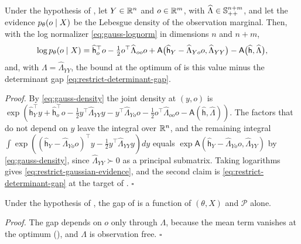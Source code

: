 Under the hypothesis of
, let
\(Y\in\mathbb R^n\) and \(o\in\mathbb R^m\), with \(\widehat\Lambda\in\mathbb S_{++}^{n+m}\), and let the
evidence \(p_\theta(o\mid X)\) be the Lebesgue density of the observation
marginal. Then, with the log normalizer \eqref{eq:gauss-lognorm} in dimensions
\(n\) and \(n+m\),
\begin{equation}
\log p_\theta(o\mid X)
=\widehat{\mathsf h}_o^\top o-\tfrac12o^\top\widehat\Lambda_{oo}o
+\mathsf A\bigl(\widehat{\mathsf h}_Y-\widehat\Lambda_{Yo}o,\widehat\Lambda_{YY}\bigr)
-\mathsf A\bigl(\widehat{\mathsf h},\widehat\Lambda\bigr),
\label{eq:restrict-gaussian-evidence}
\end{equation}
and, with \(\Lambda=\widehat\Lambda_{YY}\), the bound at the optimum of
 is this value minus the determinant gap
\eqref{eq:restrict-determinant-gap}. 

\noindent\emph{Proof.}
By \eqref{eq:gauss-density} the joint density at \((y,o)\) is
\(\exp(\widehat{\mathsf h}_Y^\top y+\widehat{\mathsf h}_o^\top o
-\tfrac12y^\top\widehat\Lambda_{YY}y-y^\top\widehat\Lambda_{Yo}o
-\tfrac12o^\top\widehat\Lambda_{oo}o-\mathsf A(\widehat{\mathsf h},\widehat\Lambda))\).
The factors that do not depend on \(y\) leave the integral over \(\mathbb R^n\), and the
remaining integral
\(\int\exp((\widehat{\mathsf h}_Y-\widehat\Lambda_{Yo}o)^\top y-\tfrac12y^\top\widehat\Lambda_{YY}y)dy\)
equals \(\exp\mathsf A(\widehat{\mathsf h}_Y-\widehat\Lambda_{Yo}o,\widehat\Lambda_{YY})\) by
\eqref{eq:gauss-density}, since \(\widehat\Lambda_{YY}\succ0\) as a principal submatrix.
Taking logarithms gives \eqref{eq:restrict-gaussian-evidence}, and the second claim
is \eqref{eq:restrict-determinant-gap} at the target of
. \(\square\)

Under the hypothesis of
, the gap of
 is a function of \((\theta,X)\) and
\(\mathcal P\) alone. 

\noindent\emph{Proof.}
The gap depends on \(o\) only through \(\Lambda\), because the mean term vanishes
at the optimum (), and \(\Lambda\) is
observation free. \(\square\)

